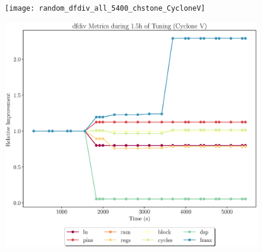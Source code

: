 \documentclass[12pt, a4paper]{article}
\begin{document}
\begin{figure}[htpb]
    \begin{minipage}{.48\textwidth}
        \texttt{[image: random\_dfdiv\_all\_5400\_chstone\_CycloneV]}
    \end{minipage}%
    \hfill
    \begin{minipage}{.48\textwidth}
        \includegraphics[scale=.25]{dfdiv_all_5400_chstone_CycloneV}
    \end{minipage}%
\end{figure}

\newpage
\end{document}
